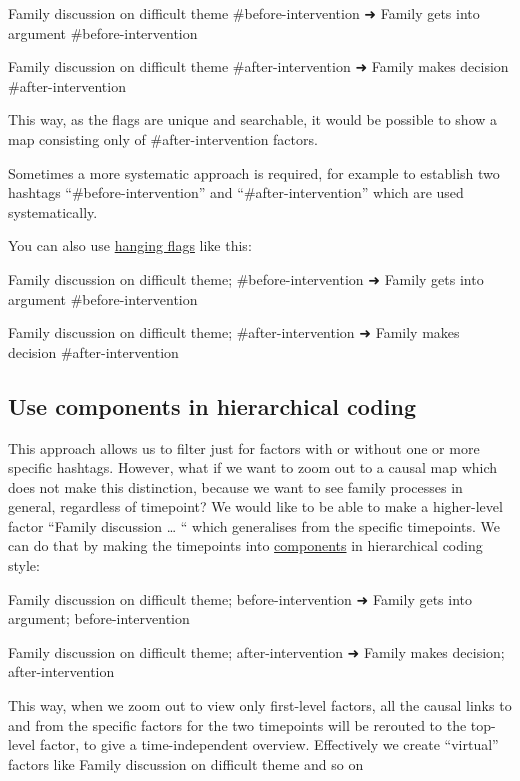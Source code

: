 \documentclass[
]{book}
\begin{document}
Family discussion on difficult theme \#before-intervention ➜ Family gets into argument \#before-intervention

Family discussion on difficult theme \#after-intervention ➜ Family makes decision \#after-intervention

This way, as the flags are unique and searchable, it would be possible to show a map consisting only of \#after-intervention factors.

Sometimes a more systematic approach is required, for example to establish two hashtags ``\#before-intervention'' and ``\#after-intervention'' which are used systematically.

You can also use \protect\hyperlink{xhanging-flags}{hanging flags} like this:

Family discussion on difficult theme; \#before-intervention ➜ Family gets into argument \#before-intervention

Family discussion on difficult theme; \#after-intervention ➜ Family makes decision \#after-intervention

\hypertarget{use-components-in-hierarchical-coding}{%
\subsection{Use components in hierarchical coding}\label{use-components-in-hierarchical-coding}}

This approach allows us to filter just for factors with or without one or more specific hashtags. However, what if we want to zoom out to a causal map which does not make this distinction, because we want to see family processes in general, regardless of timepoint? We would like to be able to make a higher-level factor ``Family discussion \ldots{} `` which generalises from the specific timepoints. We can do that by making the timepoints into \href{https://causalmapdocumentation.blot.im/search?q=component}{components} in hierarchical coding style:

Family discussion on difficult theme; before-intervention ➜ Family gets into argument; before-intervention

Family discussion on difficult theme; after-intervention ➜ Family makes decision; after-intervention

This way, when we zoom out to view only first-level factors, all the causal links to and from the specific factors for the two timepoints will be rerouted to the top-level factor, to give a time-independent overview. Effectively we create ``virtual'' factors like Family discussion on difficult theme and so on
\end{document}
